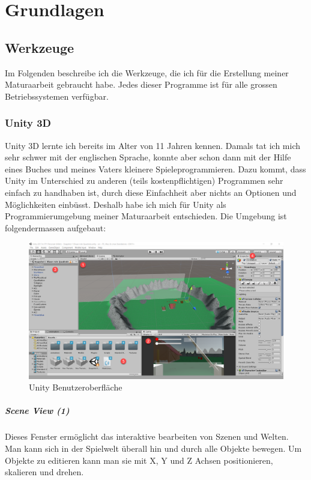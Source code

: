 \chapter{Grundlagen}

\section{Werkzeuge}
Im Folgenden beschreibe ich die Werkzeuge, die ich für die Erstellung meiner Maturaarbeit gebraucht habe.
Jedes dieser Programme ist für alle grossen Betriebssystemen verfügbar.

\subsection{Unity 3D}

Unity 3D lernte ich bereits im Alter von 11 Jahren kennen.
Damals tat ich mich sehr schwer mit der englischen Sprache, konnte aber schon dann mit der Hilfe eines Buches und meines Vaters kleinere \glqq Spiele\grqq programmieren.
Dazu kommt, dass Unity im Unterschied zu anderen (teils kostenpflichtigen) Programmen sehr einfach zu handhaben ist, durch diese Einfachheit aber nichts an Optionen und Möglichkeiten einbüsst. Deshalb habe ich mich für Unity als Programmierumgebung meiner Maturaarbeit entschieden. Die Umgebung ist folgendermassen aufgebaut:

\begin{figure}[H]
\includegraphics[scale=0.4]{screenshots/unityide.png}
\caption{Unity Benutzeroberfläche}
\end{figure}

\paragraph{Scene View (1)}
Dieses Fenster ermöglicht das interaktive bearbeiten von Szenen und Welten.
Man kann sich in der Spielwelt überall hin und durch alle Objekte bewegen. Um Objekte zu editieren kann man sie mit X, Y und Z Achsen positionieren, skalieren und drehen.

